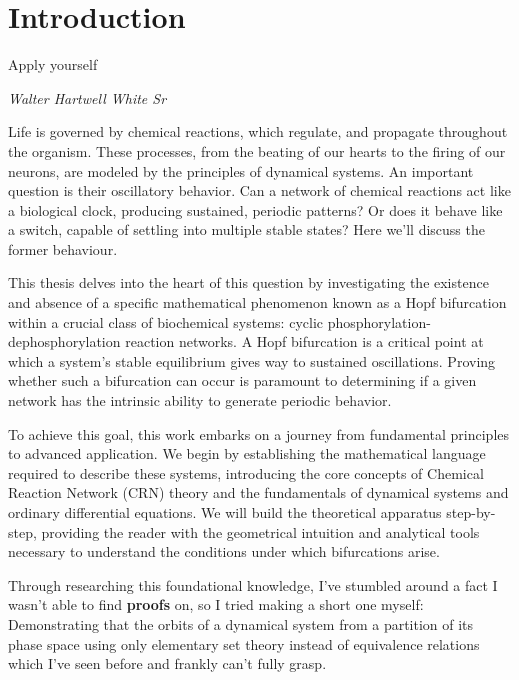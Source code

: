 \chapter{Introduction}
\epigraph{Apply yourself}{\textit{Walter Hartwell White Sr}}

\label{intro}

Life is governed by chemical reactions, which regulate, and propagate throughout the organism. These processes, from the beating of our hearts to the firing of our neurons, are modeled by the principles of dynamical systems. An important question is their oscillatory behavior. Can a network of chemical reactions act like a biological clock, producing sustained, periodic patterns? Or does it behave like a switch, capable of settling into multiple stable states? Here we'll discuss the former behaviour.

This thesis delves into the heart of this question by investigating the existence and absence of a specific mathematical phenomenon known as a Hopf bifurcation within a crucial class of biochemical systems: cyclic phosphorylation-dephosphorylation reaction networks. A Hopf bifurcation is a critical point at which a system's stable equilibrium gives way to sustained oscillations. Proving whether such a bifurcation can occur is paramount to determining if a given network has the intrinsic ability to generate periodic behavior.

To achieve this goal, this work embarks on a journey from fundamental principles to advanced application. We begin by establishing the mathematical language required to describe these systems, introducing the core concepts of Chemical Reaction Network (CRN) theory and the fundamentals of dynamical systems and ordinary differential equations. We will build the theoretical apparatus step-by-step, providing the reader with the geometrical intuition and analytical tools necessary to understand the conditions under which bifurcations arise.

Through researching this foundational knowledge, I've stumbled around a fact I wasn't able to find \textbf{ proofs } on, so I tried making a short one myself: Demonstrating that the orbits of a dynamical system from a partition of its phase space using only elementary set theory instead of equivalence relations which I've seen before and frankly can't fully grasp.

